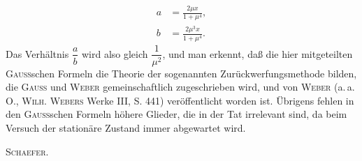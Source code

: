 \[
\begin{aligned}
a&=\frac{2\mu x}{1+\mu^4},\\[1ex]
b&=\frac{2\mu^3x}{1+\mu^4}.
\end{aligned}
\]
\noindent Das Verhältnis \(\dfrac ab\) wird also gleich \(\dfrac1{\mu^2}\), und man erkennt, daß die hier mitgeteilten \textsc{Gauss}schen Formeln
die Theorie der sogenannten Zurückwerfungsmethode bilden, die \textsc{Gauss} und \textsc{Weber} gemeinschaftlich zugeschrieben
wird, und von \textsc{Weber} (a.\,a.\,O., \textsc{Wilh. Webers} Werke III, S. 441) veröffentlicht worden ist.
Übrigens fehlen in den \textsc{Gauss}schen Formeln höhere Glieder, die in der Tat irrelevant sind, da beim Versuch
der stationäre Zustand immer abgewartet wird.
\par\raggedleft\textsc{Schaefer}.\par
\clearpage\endgroup\endgroup
